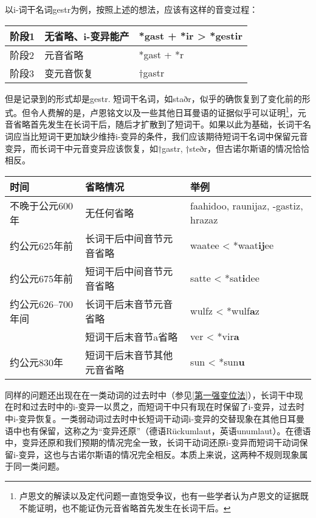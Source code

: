 {{以i-词干名词gestr为例，按照上述的想法，应该有这样的音变过程：

\begin{longtable}{lll}
  \toprule
  阶段1 & 无省略、i-变异能产 & *gast + *ir \textgreater{} *gestir \\
  \midrule
  \endhead
  \bottomrule
  \endfoot
  阶段2 & 元音省略           & *gast + *r                         \\
  阶段3 & 变元音恢复         & †gastr                             \\
\end{longtable}

但是记录到的形式却是gestr.
短词干名词，如staðr，似乎的确恢复到了变化前的形式。但令人费解的是，卢恩铭文以及一些其他日耳曼语的证据似乎可以证明\footnote{卢恩文的解读以及定代问题一直饱受争议，也有一些学者认为卢恩文的证据既不能证明，也不能证伪元音省略首先发生在长词干后。}，元音省略首先发生在长词干后，随后才扩散到了短词干。如果以此为基础，长词干名词应当比短词干更加缺少维持i-变异的条件，我们应该期待短词干名词中保留元音变异，而长词干中元音变异应该恢复，如†gastr,
†steðr，但古诺尔斯语的情况恰恰相反。

\begin{longtable}{lll}
  \toprule
  时间               & 省略情况                   & 举例                                \\
  \midrule
  \endhead
  \bottomrule
  \endfoot
  不晚于公元600年    & 无任何省略                 & faahidoo, raunijaz, -gastiz, hrazaz \\
  约公元625年前      & 长词干后中间音节元音省略   & waatee \textless{}
  *waat\textbf{ij}ee                                                                    \\
  约公元675年前      & 短词干后中间音节元音省略   & satte \textless{}
  *sat\textbf{i}dee                                                                     \\
  约公元626--700年间 & 长词干后末音节元音省略     & wulfz \textless{}
  *wulf\textbf{a}z                                                                      \\
                     & 短词干后末音节a省略        & ver \textless{} *vir\textbf{a}      \\
  约公元830年        & 短词干后末音节其他元音省略 & sun \textless{}
  *sun\textbf{u}                                                                        \\
\end{longtable}

同样的问题还出现在在一类动词的过去时中（参见\ref{第一强变位法}），长词干中现在时和过去时中的i-变异一以贯之，而短词干中只有现在时保留了i-变异，过去时中i-变异恢复。一类弱动词过去时中长短词干动词i-变异的交替现象在其他日耳曼语中也有保留，这称之为``变异还原''（德语Rückumlaut，英语unumlaut）。在德语中，变异还原和我们预期的情况完全一致，长词干动词还原i-变异而短词干动词保留i-变异，这也与古诺尔斯语的情况完全相反。本质上来说，这两种不规则现象属于同一类问题。

}}
